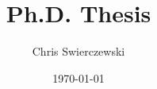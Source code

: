 \documentclass [10pt, proquest] {uwthesis}[2014/11/13]
\title{Ph.D. Thesis}
\author{Chris Swierczewski}
\date{\today}
\theoremstyle{definition}
\begin{document}
%
%

%
\textpages
%
%
%
%
%

%
%

%
%
%

%
%
%
%
\end{document}
